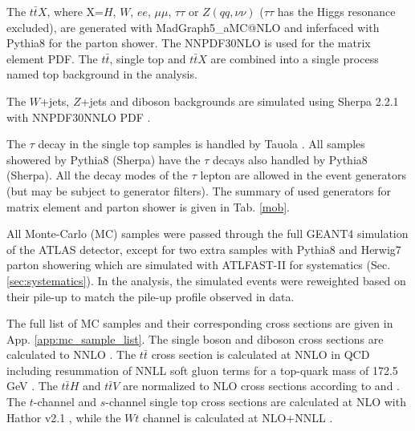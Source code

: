 The $t\bar{t}X$, where X=$H$, $W$, $ee$, $\mu\mu$, $\tau\tau$ or $Z(qq,\nu\nu)$ ($\tau\tau$ has the Higgs resonance excluded), are generated with MadGraph5\_aMC@NLO and inferfaced with Pythia8 for the parton shower. The NNPDF30NLO \cite{NNPDF30NLO} is used for the matrix element PDF. The $t\bar{t}$, single top and $t\bar{t}X$ are combined into a single process named top background in the analysis.

The $W$+jets, $Z$+jets and diboson backgrounds are simulated using Sherpa 2.2.1 \cite{Sherpa} with NNPDF30NNLO PDF \cite{NNPDF30NLO}.

The $\tau$ decay in the single top samples is handled by Tauola \cite{Tauola}. All samples showered by Pythia8 (Sherpa) have the $\tau$ decays also handled by Pythia8 (Sherpa). All the decay modes of the $\tau$ lepton are allowed in the event generators (but may be subject to generator filters). The summary of used generators for matrix element and parton shower is given in Tab. \ref{mob}.

All Monte-Carlo (MC) samples were passed through the full GEANT4 \cite{GEANT4} simulation of the ATLAS detector, except for two extra \ttbar samples with Pythia8 and Herwig7 \cite{Herwig} parton showering which are simulated with ATLFAST-II \cite{AFII} for systematics (Sec. \ref{sec:systematics}). In the analysis, the simulated events were reweighted based on their pile-up to match the pile-up profile observed in data.

The full list of MC samples and their corresponding cross sections are given in App. \ref{app:mc_sample_list}. The single boson and diboson cross sections are calculated to NNLO \cite{bosonXsec}. The $t\bar{t}$ cross section is calculated at NNLO in QCD including resummation of NNLL soft gluon terms for a top-quark mass of 172.5 GeV \cite{ttXsec}. The $t\bar{t}H$ and $t\bar{t}V$ are normalized to NLO cross sections according to \cite{HiggsBR} and \cite{ttVXsec}. The $t$-channel and $s$-channel single top cross sections are calculated at NLO with Hathor v2.1 \cite{Hather1,Hather2}, while the $Wt$ channel is calculated at NLO+NNLL \cite{WtXsec}.

